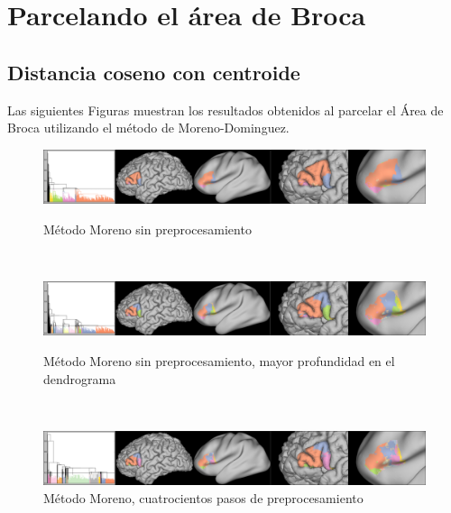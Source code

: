 \section{Parcelando el \'area de Broca}

\subsection{Distancia coseno con centroide}

Las siguientes Figuras muestran los resultados obtenidos al parcelar el \'Area
de Broca utilizando el m\'etodo de Moreno-Dominguez.

\begin{figure}[h!]
                                                                                                                        
\begin{minipage}[b]{\textwidth}
    \includegraphics[width=\textwidth]{img/broca/moreno_0.png}
    \caption{M\'etodo Moreno sin preprocesamiento}

\end{minipage} ~
                                                                                                                       
\begin{minipage}[b]{\textwidth}
    \includegraphics[width=\textwidth]{img/broca/moreno_0_deep.png}
    \caption{M\'etodo Moreno sin preprocesamiento, mayor profundidad en el 
            dendrograma}

\end{minipage} ~

\begin{minipage}[b]{\textwidth}
    \includegraphics[width=\textwidth]{img/broca/moreno_400.png}
    \caption{M\'etodo Moreno, cuatrocientos pasos de preprocesamiento}


\end{minipage}
\end{figure}
